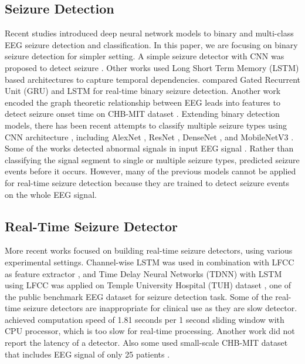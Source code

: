 \documentclass[pmlr,twocolumn,10pt]{jmlr}
\begin{document}
\subsection{Seizure Detection}
Recent studies introduced deep neural network models to binary and multi-class EEG seizure detection and classification. In this paper, we are focusing on binary seizure detection for simpler setting. A simple seizure detector with CNN was proposed to detect seizure \citep{andrzejak2001indications, acharya2018deep, yuan2018novel}. Other works used Long Short Term Memory (LSTM) \cite{hochreiter1997long} based architectures to capture temporal dependencies. \cite{golmohammadi2017gated} compared Gated Recurrent Unit (GRU) and LSTM for real-time binary seizure detection. Another work encoded the graph theoretic relationship between EEG leads into features to detect seizure onset time \citep{akbarian2020framework, zabihi2015analysis} on CHB-MIT dataset \citep{shoeb2009application, goldberger2000physiobank}. Extending binary detection models, there has been recent attempts to classify multiple seizure types using CNN architecture \citep{asif2020seizurenet, sriraam2019convolutional, daoud2019efficient, ahmedt2020neural, priyasad2021interpretable, jia2022variable}, including AlexNet \citep{krizhevsky2012imagenet, sriraam2019convolutional}, ResNet \citep{he2016deep}, DenseNet \citep{huang2017densely}, and MobileNetV3 \citep{howard2019searching}. Some of the works detected abnormal signals in input EEG signal \citep{roy2019chrononet, mohsenvand2020contrastive}. Rather than classifying the signal segment to single or multiple seizure types, \cite{daoud2019efficient} predicted seizure events before it occurs. However, many of the previous models cannot be applied for real-time seizure detection because they are trained to detect seizure events on the whole EEG signal. 

\subsection{Real-Time Seizure Detector}
More recent works focused on building real-time seizure detectors, using various experimental settings. Channel-wise LSTM was used in combination with LFCC as feature extractor \citep{shawki2020deep}, and Time Delay Neural Networks (TDNN) with LSTM using LFCC \citep{thyagachandran2020seizure} was applied on Temple University Hospital (TUH) dataset \citep{obeid2016temple}, one of the public benchmark EEG dataset for seizure detection task. Some of the real-time seizure detectors are inappropriate for clinical use as they are slow detector. \cite{shawki2020deep} achieved computation speed of 1.81 seconds per 1 second sliding window with CPU processor, which is too slow for real-time processing. Another work \citep{bomela2020real} did not report the latency of a detector. Also some used small-scale CHB-MIT dataset that includes EEG signal of only 25 patients \citep{fan2018detecting, wang2018hardware}.
\end{document}
